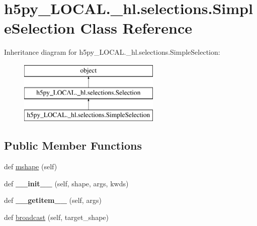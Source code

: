 \hypertarget{classh5py__LOCAL_1_1__hl_1_1selections_1_1SimpleSelection}{}\section{h5py\+\_\+\+L\+O\+C\+A\+L.\+\_\+hl.\+selections.\+Simple\+Selection Class Reference}
\label{classh5py__LOCAL_1_1__hl_1_1selections_1_1SimpleSelection}
Inheritance diagram for h5py\+\_\+\+L\+O\+C\+A\+L.\+\_\+hl.\+selections.\+Simple\+Selection\+:\begin{figure}[H]
\begin{center}
\leavevmode
\includegraphics[height=3.000000cm]{classh5py__LOCAL_1_1__hl_1_1selections_1_1SimpleSelection}
\end{center}
\end{figure}
\subsection*{Public Member Functions}
\begin{DoxyCompactItemize}
\item 
def \hyperlink{classh5py__LOCAL_1_1__hl_1_1selections_1_1SimpleSelection_a54f6ea828be0dfc9651fd22cd5ddda32}{mshape} (self)
\item 
\mbox{\label{classh5py__LOCAL_1_1__hl_1_1selections_1_1SimpleSelection_aa850f22fd6d293e7d726c2f5a8eb8b11}} 
def {\bfseries \+\_\+\+\_\+init\+\_\+\+\_\+} (self, shape, args, kwds)
\item 
\mbox{\label{classh5py__LOCAL_1_1__hl_1_1selections_1_1SimpleSelection_a58313f99ec1ab378eefd07888656d486}} 
def {\bfseries \+\_\+\+\_\+getitem\+\_\+\+\_\+} (self, args)
\item 
def \hyperlink{classh5py__LOCAL_1_1__hl_1_1selections_1_1SimpleSelection_a1bf3c175664ee8570535c49b9903d710}{broadcast} (self, target\+\_\+shape)
\end{DoxyCompactItemize}
